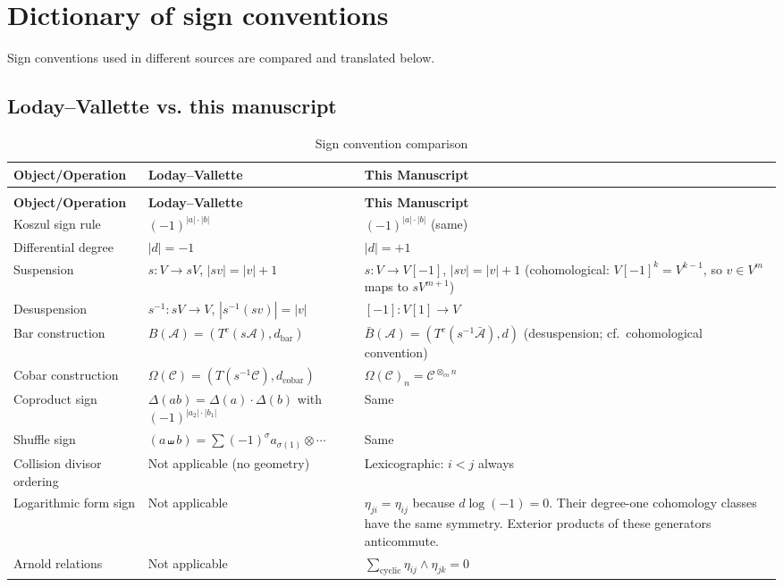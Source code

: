 \chapter{Dictionary of sign conventions}
\label{app:sign-conventions}


Sign conventions used in different sources are compared and translated below.

\section{Loday--Vallette vs. this manuscript}

\begin{center}
\begin{longtable}{|>{\raggedright\arraybackslash}p{5.8cm}|>{\raggedright\arraybackslash}p{3.9cm}|>{\raggedright\arraybackslash}p{3.9cm}|}
\caption{Sign convention comparison} \\
\hline
\textbf{Object/Operation} & \textbf{Loday--Vallette \cite{LV12}} & \textbf{This Manuscript} \\
\hline
\endfirsthead
\multicolumn{3}{c}{\tablename\ \thetable\ -- \textit{Continued}} \\
\hline
\textbf{Object/Operation} & \textbf{Loday--Vallette} & \textbf{This Manuscript} \\
\hline
\endhead
\hline
\endfoot
\hline
\endlastfoot
Koszul sign rule & $(-1)^{|a| \cdot |b|}$ & $(-1)^{|a| \cdot |b|}$ (same) \\
Differential degree & $|d| = -1$ & $|d| = +1$ \\
Suspension & $s: V \to sV$, $|sv| = |v| + 1$ & $s: V \to V[-1]$, $|sv| = |v| + 1$ (cohomological: $V[-1]^k = V^{k-1}$, so $v \in V^m$ maps to $sV^{m+1}$) \\
Desuspension & $s^{-1}: sV \to V$, $|s^{-1}(sv)| = |v|$ & $[-1]: V[1] \to V$ \\
Bar construction & $B(\mathcal{A}) = (T^c(s\mathcal{A}), d_{\text{bar}})$ & $\bar{B}(\mathcal{A}) = (T^c(s^{-1}\bar{\mathcal{A}}), d)$ (desuspension; cf.\ cohomological convention) \\
Cobar construction & $\Omega(\mathcal{C}) = (T(s^{-1}\mathcal{C}), d_{\text{cobar}})$ & $\Omega(\mathcal{C})_n = \mathcal{C}^{\otimes_{\text{co}} n}$ \\
Coproduct sign & $\Delta(ab) = \Delta(a) \cdot \Delta(b)$ with $(-1)^{|a_2| \cdot |b_1|}$ & Same \\
Shuffle sign & $(a \shuffle b) = \sum (-1)^{\sigma} a_{\sigma(1)} \otimes \cdots$ & Same \\
Collision divisor ordering & Not applicable (no geometry) & Lexicographic: $i < j$ always \\
Logarithmic form sign & Not applicable & $\eta_{ji}=\eta_{ij}$ because $d\log(-1)=0$. Their degree-one cohomology classes have the same symmetry. Exterior products of these generators anticommute. \\
Arnold relations & Not applicable & $\sum_{\text{cyclic}} \eta_{ij} \wedge \eta_{jk} = 0$ \\
\end{longtable}
\end{center}

